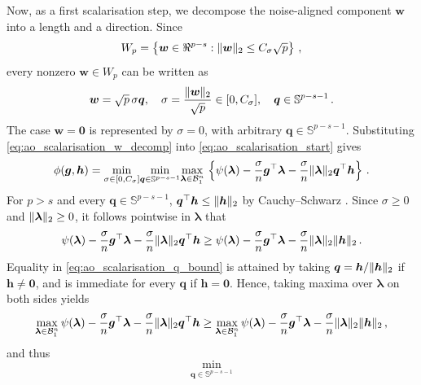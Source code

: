 \documentclass{article}
\makeatletter
\theoremstyle{definition}
\newcommand{\vnorm}[1]{%
	\ensuremath{%
		\if@display
		\left\| #1 \right\|
		\else
		\| #1 \|
		\fi
	}%
}
\newcommand*{\bb}{\boldsymbol}
\def\bw {\bb{w}}
\def\bh{\bb{h}}
\def\bg{\bb{g}}
\def\blambda{\bb{\lambda}}
\makeatother
\begin{document}
\begin{bibunit}
Now, as a first scalarisation step, we decompose the noise-aligned component $\bw$ into a length and a direction. Since
$$
	W_p
	=
	\left\{
		\bw\in\Re^{p-s}:
		\vnorm{\bw}_2
		\leq
		C_\sigma\sqrt p
	\right\} \,,
$$
every nonzero $\bw\in W_p$ can be written as
\begin{equation}
	\label{eq:ao_scalarisation_w_decomp}
	\bw
	=
	\sqrt p\,\sigma\bb{q},
	\quad
	\sigma
	=
	\frac{\vnorm{\bw}_2}{\sqrt p}
	\in[0,C_\sigma],
	\quad
	\bb{q}\in\mathbb S^{p-s-1} \,.
\end{equation}
The case $\bw=\bb 0$ is represented by $\sigma=0$, with arbitrary $\bb{q}\in\mathbb S^{p-s-1}$. Substituting \eqref{eq:ao_scalarisation_w_decomp} into \eqref{eq:ao_scalarisation_start} gives
\begin{equation}
	\label{eq:ao_scalarisation_after_w_decomp}
	\begin{aligned}
		\phi(\bg,\bh)
		=
		\underset{\sigma\in[0,C_\sigma]}{\min}
		\underset{\bb{q}\in\mathbb S^{p-s-1}}{\min}
		\underset{\blambda\in\mathcal B^n_1}{\max} \,
		\left\{
			\psi(\blambda)
			-
			\frac{\sigma}{n}
			\bg^\top\blambda
			-
			\frac{\sigma}{n}
			\vnorm{\blambda}_2
			\bb{q}^\top\bh
		\right\} \,.
	\end{aligned}
\end{equation}
For $p > s$ and every $\bb{q}\in\mathbb S^{p-s-1}$, $\bb{q}^\top\bh\leq\vnorm{\bh}_2$ by Cauchy--Schwarz \citep[Theorem~1.37(d)]{rudin+etal:1976}.
Since $\sigma\geq0$ and $\vnorm{\blambda}_2\geq0$, it follows pointwise in $\blambda$ that
\begin{equation}
	\label{eq:ao_scalarisation_q_bound}
	\psi(\blambda)
	-
	\frac{\sigma}{n}
	\bg^\top\blambda
	-
	\frac{\sigma}{n}
	\vnorm{\blambda}_2
	\bb{q}^\top\bh
	\geq
	\psi(\blambda)
	-
	\frac{\sigma}{n}
	\bg^\top\blambda
	-
	\frac{\sigma}{n}
	\vnorm{\blambda}_2
	\vnorm{\bh}_2 \,.
\end{equation}
Equality in \eqref{eq:ao_scalarisation_q_bound} is attained by taking $\bb{q}=\bh/\vnorm{\bh}_2$ if $\bh\neq\bb 0$, and is immediate for every $\bb{q}$ if $\bh=\bb 0$. Hence,
taking maxima over $\blambda$ on both sides yields
$$
\underset{\blambda \in \mathcal{B}_1^n}{\max} \, \psi(\blambda)
	-
	\frac{\sigma}{n}
	\bg^\top\blambda
	-
	\frac{\sigma}{n}
	\vnorm{\blambda}_2
	\bb{q}^\top\bh
	\geq \underset{\blambda \in \mathcal{B}_1^n}{\max} \,
	\psi(\blambda)
	-
	\frac{\sigma}{n}
	\bg^\top\blambda
	-
	\frac{\sigma}{n}
	\vnorm{\blambda}_2
	\vnorm{\bh}_2 \,,
$$
and thus
\begin{equation}
	\label{eq:q-min}
	\underset{\bb q \in \mathbb S^{p-s-1}}{\min}

\end{equation}
\end{bibunit}
\end{document}
